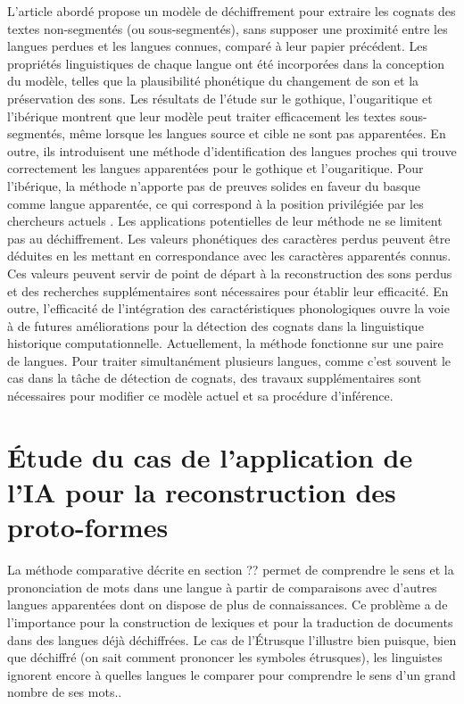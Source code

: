 \documentclass[12pt, french, twoside]{report}
\begin{document}
L'article abordé propose un modèle de déchiffrement pour extraire les cognats des textes non-segmentés (ou sous-segmentés), sans supposer une proximité entre les langues perdues et les langues connues, comparé à leur papier précédent\cite{ugaritic-and-linear-B}. Les propriétés linguistiques de chaque langue ont été incorporées dans la conception du modèle, telles que la plausibilité phonétique du changement de son et la préservation des sons. Les résultats de l'étude sur le gothique, l'ougaritique et l'ibérique montrent que leur modèle peut traiter efficacement les textes sous-segmentés, même lorsque les langues source et cible ne sont pas apparentées. En outre, ils introduisent une méthode d'identification des langues proches qui trouve correctement les langues apparentées pour le gothique et l'ougaritique. Pour l'ibérique, la méthode n'apporte pas de preuves solides en faveur du basque comme langue apparentée, ce qui correspond à la position privilégiée par les chercheurs actuels \cite{deepmind2022}. Les applications potentielles de leur méthode ne se limitent pas au déchiffrement. Les valeurs phonétiques des caractères perdus peuvent être déduites en les mettant en correspondance avec les caractères apparentés connus. Ces valeurs peuvent servir de point de départ à la reconstruction des sons perdus et des recherches supplémentaires sont nécessaires pour établir leur efficacité. En outre, l'efficacité de l'intégration des caractéristiques phonologiques ouvre la voie à de futures améliorations pour la détection des cognats dans la linguistique historique computationnelle. Actuellement, la méthode fonctionne sur une paire de langues. Pour traiter simultanément plusieurs langues, comme c'est souvent le cas dans la tâche de détection de cognats, des travaux supplémentaires sont nécessaires pour modifier ce modèle actuel et sa procédure d'inférence. \\

\chapter{Étude du cas de l'application de l'IA pour la reconstruction des proto-formes}
La méthode comparative décrite en section ?? permet de comprendre le sens et la prononciation de mots dans une langue à partir de comparaisons avec d'autres langues apparentées dont on dispose de plus de connaissances. Ce problème a de l'importance pour la construction de lexiques et pour la traduction de documents dans des langues déjà déchiffrées. Le cas de l'Étrusque l'illustre bien puisque, bien que déchiffré (on sait comment prononcer les symboles étrusques), les linguistes ignorent encore à quelles langues le comparer pour comprendre le sens d'un grand nombre de ses mots.\cite{bnf_etrusque}.
\end{document}
